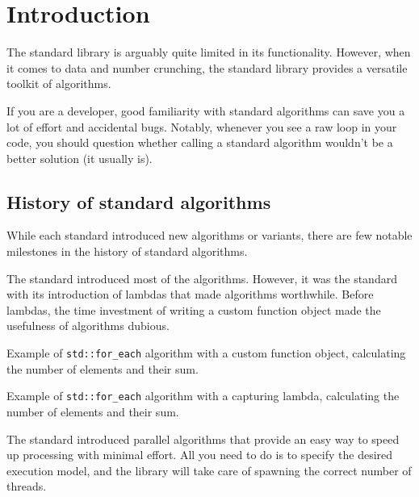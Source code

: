 \chapter{Introduction}

The \CC standard library is arguably quite limited in its functionality. However, when it comes to data and number crunching, the \CC standard library provides a versatile toolkit of algorithms.

If you are a \CC developer, good familiarity with \CC standard algorithms can save you a lot of effort and accidental bugs. Notably, whenever you see a raw loop in your code, you should question whether calling a standard algorithm wouldn't be a better solution (it usually is).

\section{History of standard \texorpdfstring{\CC}{C++} algorithms}

While each \CC standard introduced new algorithms or variants, there are few notable milestones in the history of \CC standard algorithms.

The  standard introduced most of the algorithms. However, it was the  standard with its introduction of lambdas that made algorithms worthwhile. Before lambdas, the time investment of writing a custom function object made the usefulness of algorithms dubious.

\begin{box-note}
\footnotesize Example of \texttt{std::for_each} algorithm with a custom function object, calculating the number of elements and their sum.
\tcblower
{}
\end{box-note}

\begin{box-note}
\footnotesize Example of \texttt{std::for_each} algorithm with a capturing lambda, calculating the number of elements and their sum.
\tcblower
{}
\end{box-note}

The  standard introduced parallel algorithms that provide an easy way to speed up processing with minimal effort. All you need to do is to specify the desired execution model, and the library will take care of spawning the correct number of threads.

